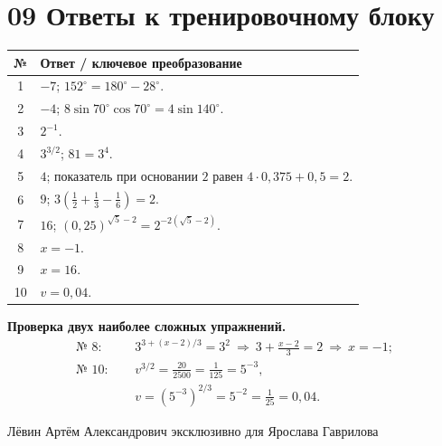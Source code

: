 \documentclass[a4paper,12pt]{article}
\begin{document}
\section*{09 \quad Ответы к тренировочному блоку}
\renewcommand{\arraystretch}{1.55}
\begin{center}
\begin{tabularx}{\linewidth}{@{}c X@{}}
\toprule
\textbf{№} & \textbf{Ответ / ключевое преобразование}\\
\midrule
1 & $-7$; $152^\circ=180^\circ-28^\circ$. \\
2 & $-4$; $8\sin70^\circ\cos70^\circ=4\sin140^\circ$. \\
3 & $2^{-1}$. \\
4 & $3^{3/2}$; $81=3^4$. \\
5 & $4$; показатель при основании $2$ равен $4\cdot0{,}375+0{,}5=2$. \\
6 & $9$; $3\left(\frac12+\frac13-\frac16\right)=2$. \\
7 & $16$; $(0{,}25)^{\sqrt5-2}=2^{-2(\sqrt5-2)}$. \\
8 & $x=-1$. \\
9 & $x=16$. \\
10 & $v=0{,}04$. \\
\bottomrule
\end{tabularx}
\end{center}
\medskip
\textbf{Проверка двух наиболее сложных упражнений.}
\[
\begin{aligned}
\text{№ 8: }&\quad 3^{3+(x-2)/3}=3^2
\ \Rightarrow\ 3+\frac{x-2}{3}=2
\ \Rightarrow\ x=-1;\\[6pt]
\text{№ 10: }&\quad v^{3/2}=\frac{20}{2500}=\frac1{125}=5^{-3},\\
&\quad v=(5^{-3})^{2/3}=5^{-2}=\frac1{25}=0{,}04.
\end{aligned}
\]
\vfill
\begin{center}
\textcolor{darkaccent}{\small Лёвин Артём Александрович \quad\textbullet\quad эксклюзивно для Ярослава Гаврилова}
\end{center}
\end{document}
